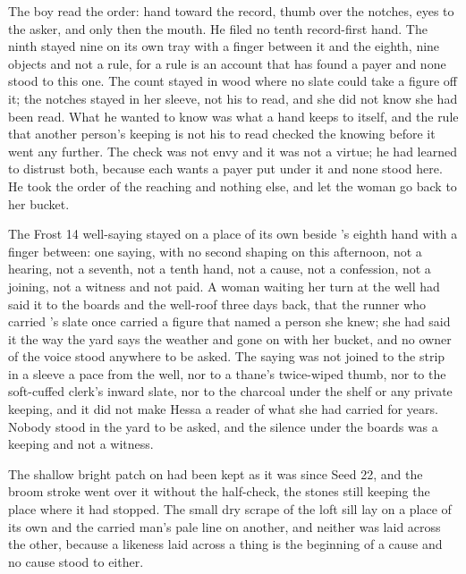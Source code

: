 The boy read the order: hand toward the record, thumb over the notches, eyes to the asker, and only then the mouth. He filed no tenth record-first hand. The ninth stayed nine on its own tray with a finger between it and the eighth, nine objects and not a rule, for a rule is an account that has found a payer and none stood to this one. The count stayed in wood where no slate could take a figure off it; the notches stayed in her sleeve, not his to read, and she did not know she had been read. What he wanted to know was what a hand keeps to itself, and the rule that another person's keeping is not his to read checked the knowing before it went any further. The check was not envy and it was not a virtue; he had learned to distrust both, because each wants a payer put under it and none stood here. He took the order of the reaching and nothing else, and let the woman go back to her bucket.

The Frost 14 well-saying stayed on a place of its own beside 's eighth hand with a finger between: one saying, with no second shaping on this afternoon, not a hearing, not a seventh, not a tenth hand, not a cause, not a confession, not a joining, not a witness and not paid. A woman waiting her turn at the well had said it to the boards and the well-roof three days back, that the runner who carried 's slate once carried a figure that named a person she knew; she had said it the way the yard says the weather and gone on with her bucket, and no owner of the voice stood anywhere to be asked. The saying was not joined to the strip in a sleeve a pace from the well, nor to a thane's twice-wiped thumb, nor to the soft-cuffed clerk's inward slate, nor to the charcoal under the shelf or any private keeping, and it did not make Hessa a reader of what she had carried for years. Nobody stood in the yard to be asked, and the silence under the boards was a keeping and not a witness.

\scenebreak

The shallow bright patch on  had been kept as it was since Seed 22, and the broom stroke went over it without the half-check, the stones still keeping the place where it had stopped. The small dry scrape of the loft sill lay on a place of its own and the carried man's pale line on another, and neither was laid across the other, because a likeness laid across a thing is the beginning of a cause and no cause stood to either.

